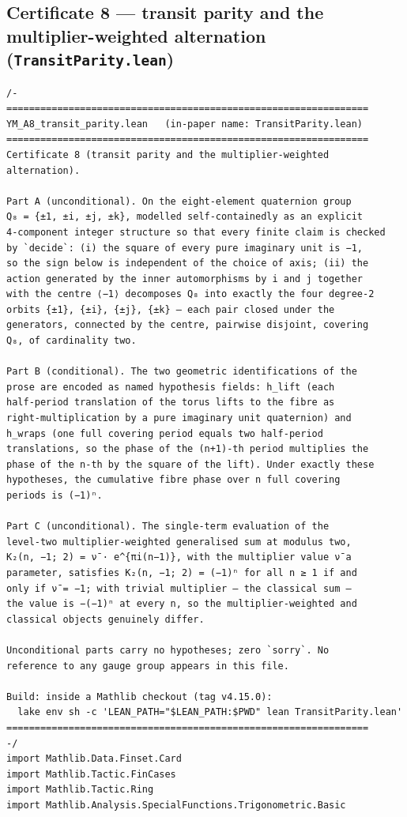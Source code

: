 \documentclass[11pt,a4paper]{article}
\theoremstyle{plain}
\theoremstyle{definition}
\theoremstyle{remark}
\begin{document}
\subsection*{Certificate 8 --- transit parity and the multiplier-weighted alternation (\texttt{TransitParity.lean})}
\begin{Verbatim}[fontsize=\footnotesize,breaklines=true,breakanywhere=true,formatcom=\leanmono]
/-
================================================================
YM_A8_transit_parity.lean   (in-paper name: TransitParity.lean)
================================================================
Certificate 8 (transit parity and the multiplier-weighted
alternation).

Part A (unconditional). On the eight-element quaternion group
Q₈ = {±1, ±i, ±j, ±k}, modelled self-containedly as an explicit
4-component integer structure so that every finite claim is checked
by `decide`: (i) the square of every pure imaginary unit is −1,
so the sign below is independent of the choice of axis; (ii) the
action generated by the inner automorphisms by i and j together
with the centre ⟨−1⟩ decomposes Q₈ into exactly the four degree-2
orbits {±1}, {±i}, {±j}, {±k} — each pair closed under the
generators, connected by the centre, pairwise disjoint, covering
Q₈, of cardinality two.

Part B (conditional). The two geometric identifications of the
prose are encoded as named hypothesis fields: h_lift (each
half-period translation of the torus lifts to the fibre as
right-multiplication by a pure imaginary unit quaternion) and
h_wraps (one full covering period equals two half-period
translations, so the phase of the (n+1)-th period multiplies the
phase of the n-th by the square of the lift). Under exactly these
hypotheses, the cumulative fibre phase over n full covering
periods is (−1)ⁿ.

Part C (unconditional). The single-term evaluation of the
level-two multiplier-weighted generalised sum at modulus two,
K₂(n, −1; 2) = ν̄ · e^{πi(n−1)}, with the multiplier value ν̄ a
parameter, satisfies K₂(n, −1; 2) = (−1)ⁿ for all n ≥ 1 if and
only if ν̄ = −1; with trivial multiplier — the classical sum —
the value is −(−1)ⁿ at every n, so the multiplier-weighted and
classical objects genuinely differ.

Unconditional parts carry no hypotheses; zero `sorry`. No
reference to any gauge group appears in this file.

Build: inside a Mathlib checkout (tag v4.15.0):
  lake env sh -c 'LEAN_PATH="$LEAN_PATH:$PWD" lean TransitParity.lean'
================================================================
-/
import Mathlib.Data.Finset.Card
import Mathlib.Tactic.FinCases
import Mathlib.Tactic.Ring
import Mathlib.Analysis.SpecialFunctions.Trigonometric.Basic


\end{Verbatim}
\end{document}
